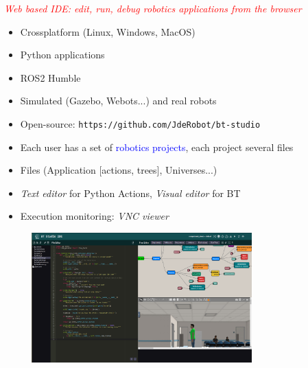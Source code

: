 \documentclass[notes,slidesec,a4]{seminar}
\begin{document}
\begin{hslide}
\centerline{\textit{\textcolor{red}{Web based IDE: edit, run, debug robotics applications from the browser}}}
\vspace{0.2cm}
\vspace{-0.2cm}
\begin{itemize}
\item Crossplatform (Linux, Windows, MacOS)
\item Python applications 
\item ROS2 Humble
\item Simulated (Gazebo, Webots...) and real robots 
\item Open-source: \texttt{https://github.com/JdeRobot/bt-studio}
\item Each user has a set of \textcolor{blue}{robotics projects}, each project several files
\end{itemize}

\newpage
{}
\vspace{-0.3cm}
\begin{itemize}
\item Files (Application [actions, trees], Universes...)
\item \textit{Text editor} for Python Actions, \textit{Visual editor} for BT
\item Execution monitoring: \textit{VNC viewer}
\end{itemize}
\begin{center}
  \begin{figure}
    \includegraphics[width=8.5cm]{figs/BtStudio0.6-2.png}
     \end{figure}
\end{center}



\end{hslide}
\end{document}
